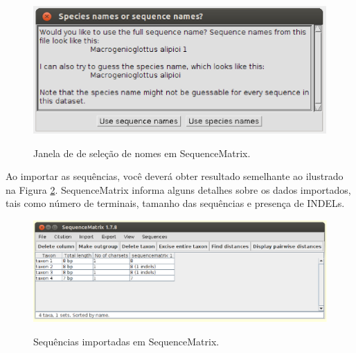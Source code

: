 \begin{refsection}
  \begin{figure}[H]
       \centering
      {\includegraphics[scale=0.7]{figures/tut7/seqmatrix_2b.eps}}
	{\caption[Janela de seleção de nomes em SequenceMatrix]{Janela de de seleção de nomes em SequenceMatrix.}\label{tut7:fig:seqmatrix_2b}}
  \end{figure}


Ao importar as sequências, você deverá obter resultado semelhante ao ilustrado na Figura \ref{tut7:fig:seqmatrix_3}. SequenceMatrix informa alguns detalhes sobre os dados importados, tais como número de terminais, tamanho das sequências e presença de INDELs.\\

  \begin{figure}[H]
       \centering
      {\includegraphics[scale=0.5]{figures/tut7/seqmatrix_3.eps}}
	{\caption[Sequências importadas em SequenceMatrix]{Sequências importadas em SequenceMatrix.}\label{tut7:fig:seqmatrix_3}}
  \end{figure}



\end{refsection}

